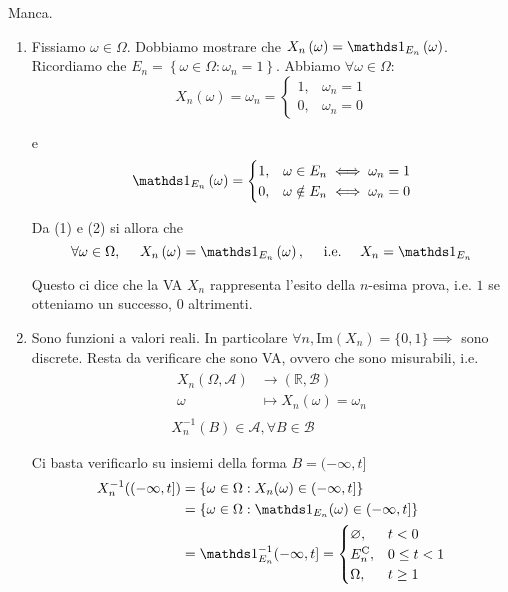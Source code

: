 Manca.
\Soluzione
\begin{enumerate}
\item Fissiamo $\omega \in \Omega $. Dobbiamo mostrare che $X_{n}\left( \omega \right) =\Ind_{E_{n}}\left( \omega \right)$. Ricordiamo che $E_{n} =\left\{\omega \in \Omega :\omega _{n} =1\right\}$. Abbiamo $\forall \omega \in \Omega $:\begin{equation}
X_{n}\left( \omega \right) =\omega _{n} =\begin{cases}
1, & \omega _{n} =1\\
0, & \omega _{n} =0
\end{cases}
\end{equation}

e
\begin{equation}
\Ind_{E_{n}}\left( \omega \right) =\begin{cases}
1, & \omega \in E_{n} \iff \omega _{n} =1\\
0, & \omega \notin E_{n} \iff \omega _{n} =0
\end{cases}
\end{equation}

Da (1) e (2) si allora che
\begin{equation*}
\forall \omega \in \Omega ,\ \ \ \ X_{n}\left( \omega \right) =\Ind_{E_{n}}\left( \omega \right) ,\ \ \ \ \text{i.e.} \ \ \ \ X_{n} =\Ind_{E_{n}}
\end{equation*}

\begin{oss}
Questo ci dice che la VA $X_{n}$ rappresenta l'esito della $n$-esima prova, i.e. $1$ se otteniamo un successo, $0$ altrimenti.
\end{oss}
\item Sono funzioni a valori reali. In particolare $\forall n,\mathrm{Im}( X_{n}) =\{0,1\} \implies $ sono discrete. Resta da verificare che sono VA, ovvero che sono misurabili, i.e.\begin{gather*}
\begin{aligned}
X_{n}( \Omega ,\mathcal{A}) & \rightarrow (\mathbb{R} ,\mathcal{B})\\
\omega  & \mapsto X_{n}( \omega ) =\omega _{n}
\end{aligned}\\
X_{n}^{-1}( B) \in \mathcal{A} ,\forall B\in \mathcal{B}
\end{gather*}

Ci basta verificarlo su insiemi della forma $B=( -\infty ,t]$\begin{align*}
X_{n}^{-1}(( -\infty ,t]) & =\{\omega \in \Omega :X_{n}( \omega ) \in ( -\infty ,t]\}\\
 & =\{\omega \in \Omega :\Ind_{E_{n}}( \omega ) \in ( -\infty ,t]\}\\
 & =\Ind_{E_{n}}^{-1}( -\infty ,t] =\begin{cases}
\emptyset , & t< 0\\
E_{n}\complementary , & 0\leq t< 1\\
\Omega , & t\geq 1
\end{cases}
\end{align*}


\end{enumerate}
